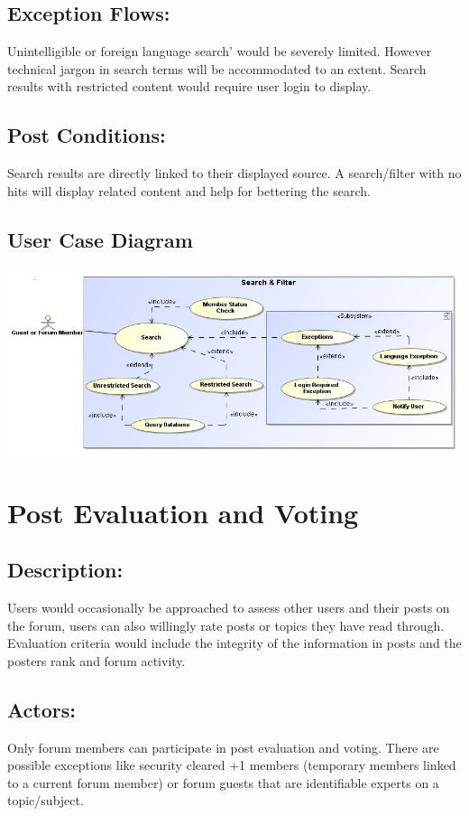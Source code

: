 \documentclass[12pt, oneside]{book}
\begin{document}
\subsection{Exception Flows:} 
Unintelligible or foreign language search’ would be severely limited. However technical jargon in search terms will be accommodated to an extent. Search results with restricted content would require user login to display.
\subsection{Post Conditions:} 
Search results are directly linked to their displayed source. A search/filter with no hits will display related content and help for bettering the search.
\subsection{User Case Diagram}
\begin{center}
\includegraphics[scale=0.5]{SearchAndFilter.png}
\end{center}
\section{Post Evaluation and Voting}
\subsection{Description:} 
Users would occasionally be approached to assess other users and their posts on the forum, users can also willingly rate posts or topics they have read through. Evaluation criteria would include the integrity of the information in posts and the posters rank and forum activity.
\subsection{Actors:} 
Only forum members can participate in post evaluation and voting. There are possible exceptions like security cleared +1 members (temporary members linked to a current forum member) or forum guests that are identifiable experts   on a topic/subject. 
\end{document}
